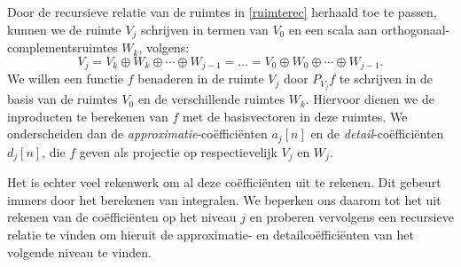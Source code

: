 Door de recursieve relatie van de ruimtes in \eqref{ruimterec} herhaald toe te passen,
kunnen we de ruimte $V_j$ schrijven in termen van $V_0$ en een scala aan
orthogonaal-complementsruimtes $W_k$, volgens:
\begin{equation}
  \label{ruimte_splitsing}
  V_j = V_k \oplus W_k \oplus \cdots \oplus W_{j-1} = \ldots
  = V_0 \oplus W_0 \oplus \cdots \oplus W_{j-1}.
\end{equation}
We willen een functie $f$ benaderen in de ruimte $V_j$ door $P_{V_j}f$ te schrijven in
de basis van de ruimtes $V_0$ en de verschillende ruimtes $W_k$. Hiervoor dienen we de inproducten
te berekenen van $f$ met de basisvectoren in deze ruimtes.
We onderscheiden dan de \emph{approximatie}-co\"effici\"enten $a_j[n]$ en 
de \emph{detail}-co\"effici\"enten $d_j[n]$, die
$f$ geven als projectie op  respectievelijk $V_j$ en $W_j$.

Het is echter veel rekenwerk om al deze co\"effici\"enten uit te rekenen. 
Dit gebeurt immers door het berekenen van integralen. 
We beperken ons daarom tot het uit rekenen van de co\"effici\"enten op het niveau $j$ 
en proberen vervolgens een recursieve relatie te vinden
om hieruit de approximatie- en detailco\"effici\"enten van het volgende niveau te vinden.

